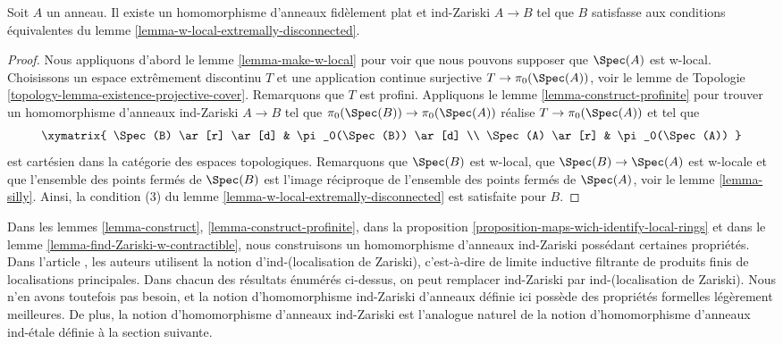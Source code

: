 \begin{lemma}
\label{lemma-find-Zariski-w-contractible}
Soit $A$ un anneau. Il existe un homomorphisme d'anneaux fidèlement plat et ind-Zariski
$A \to B$ tel que $B$ satisfasse aux conditions équivalentes
du lemme \ref{lemma-w-local-extremally-disconnected}.
\end{lemma}

\begin{proof}
Nous appliquons d'abord le lemme \ref{lemma-make-w-local} pour voir que nous pouvons supposer que
$\Spec(A)$ est w-local.
Choisissons un espace extrêmement discontinu $T$ et une application continue surjective
$T \to \pi_0(\Spec(A))$, voir le
lemme de Topologie \ref{topology-lemma-existence-projective-cover}.
Remarquons que $T$ est profini. Appliquons le lemme \ref{lemma-construct-profinite}
pour trouver un homomorphisme d'anneaux ind-Zariski $A \to B$ tel que
$\pi_0(\Spec(B)) \to \pi_0(\Spec(A))$ réalise $T \to \pi_0(\Spec(A))$
et tel que
$$
\xymatrix{
\Spec(B) \ar[r] \ar[d] & \pi_0(\Spec(B)) \ar[d] \\
\Spec(A) \ar[r] & \pi_0(\Spec(A))
}
$$
est cartésien dans la catégorie des espaces topologiques. Remarquons que $\Spec(B)$
est w-local, que $\Spec(B) \to \Spec(A)$ est w-locale et que
l'ensemble des points fermés de $\Spec(B)$ est l'image réciproque de
l'ensemble des points fermés de $\Spec(A)$, voir le lemme \ref{lemma-silly}.
Ainsi, la condition (3) du
lemme \ref{lemma-w-local-extremally-disconnected}
est satisfaite pour $B$.
\end{proof}

\begin{remark}
\label{remark-slightly-stronger}
Dans les lemmes \ref{lemma-construct}, \ref{lemma-construct-profinite},
dans la proposition \ref{proposition-maps-wich-identify-local-rings} et dans le
lemme \ref{lemma-find-Zariski-w-contractible}, nous construisons un homomorphisme d'anneaux ind-Zariski
possédant certaines propriétés. Dans l'article \cite{BS}, les auteurs utilisent la notion
d'ind-(localisation de Zariski), c'est-à-dire de limite inductive filtrante de produits finis
de localisations principales. Dans chacun des résultats énumérés ci-dessus, on peut remplacer ind-Zariski
par ind-(localisation de Zariski).
Nous n'en avons toutefois pas besoin, et la notion d'homomorphisme ind-Zariski
d'anneaux définie ici possède des propriétés formelles légèrement meilleures. De plus,
la notion d'homomorphisme d'anneaux ind-Zariski est l'analogue naturel de la
notion d'homomorphisme d'anneaux ind-\'etale définie à la section suivante.
\end{remark}





